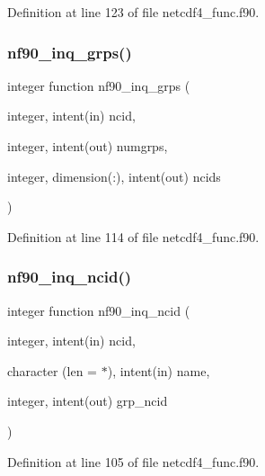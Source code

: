 Definition at line 123 of file netcdf4\+\_\+func.\+f90.

\mbox{\label{netcdf4__func_8f90_a3281b7e51942b73049a399236b009293}} 
\subsubsection{\texorpdfstring{nf90\+\_\+inq\+\_\+grps()}{nf90\_inq\_grps()}}
{\footnotesize\ttfamily integer function nf90\+\_\+inq\+\_\+grps (\begin{DoxyParamCaption}\item[{integer, intent(in)}]{ncid,  }\item[{integer, intent(out)}]{numgrps,  }\item[{integer, dimension(\+:), intent(out)}]{ncids }\end{DoxyParamCaption})}



Definition at line 114 of file netcdf4\+\_\+func.\+f90.

\mbox{\label{netcdf4__func_8f90_a038524b4eab7c7b56fd9941d521306b4}} 
\subsubsection{\texorpdfstring{nf90\+\_\+inq\+\_\+ncid()}{nf90\_inq\_ncid()}}
{\footnotesize\ttfamily integer function nf90\+\_\+inq\+\_\+ncid (\begin{DoxyParamCaption}\item[{integer, intent(in)}]{ncid,  }\item[{character (len = $\ast$), intent(in)}]{name,  }\item[{integer, intent(out)}]{grp\+\_\+ncid }\end{DoxyParamCaption})}



Definition at line 105 of file netcdf4\+\_\+func.\+f90.

\mbox{\label{netcdf4__func_8f90_a94678c55c97098176c2b249d4d878f8e}} 
